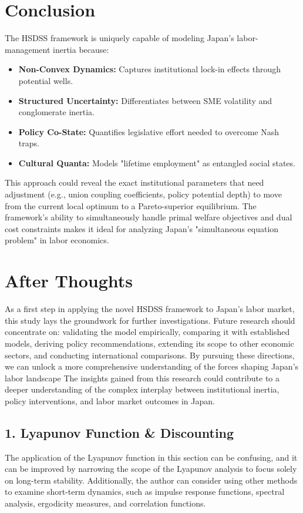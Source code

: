 \documentclass[10pt]{article}
\theoremstyle{definition}
\begin{document}
\section{Conclusion}

The HSDSS framework is uniquely capable of modeling Japan's labor-management inertia because:

\begin{itemize}
    \item \textbf{Non-Convex Dynamics:} Captures institutional lock-in effects through potential wells.
    \item \textbf{Structured Uncertainty:} Differentiates between SME volatility and conglomerate inertia.
    \item \textbf{Policy Co-State:} Quantifies legislative effort needed to overcome Nash traps.
    \item \textbf{Cultural Quanta:} Models "lifetime employment" as entangled social states.
\end{itemize}

This approach could reveal the exact institutional parameters that need adjustment (e.g., union coupling coefficients, policy potential depth) to move from the current local optimum to a Pareto-superior equilibrium. The framework's ability to simultaneously handle primal welfare objectives and dual cost constraints makes it ideal for analyzing Japan's "simultaneous equation problem" in labor economics.

\section{After Thoughts}

As a first step in applying the novel HSDSS framework to Japan's labor market, this study lays the groundwork for further investigations. Future research should concentrate on: validating the model empirically, comparing it with established models, deriving policy recommendations, extending its scope to other economic sectors, and conducting international comparisons. By pursuing these directions, we can unlock a more comprehensive understanding of the forces shaping Japan's labor landscape
The insights gained from this research could contribute to a deeper understanding of the complex interplay between institutional inertia, policy interventions, and labor market outcomes in Japan.

\subsection{1. Lyapunov Function \& Discounting}
The application of the Lyapunov function in this section can be confusing, and it can be improved by narrowing the scope of the Lyapunov analysis to focus solely on long-term stability. Additionally, the author can consider using other methods to examine short-term dynamics, such as impulse response functions, spectral analysis, ergodicity measures, and correlation functions.
\end{document}
